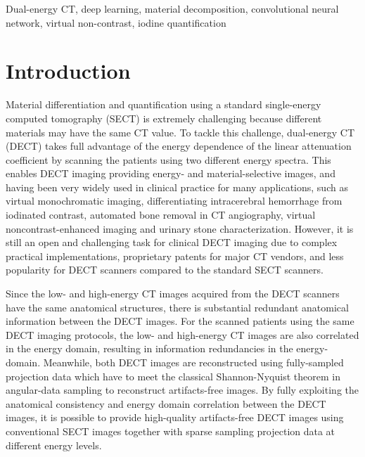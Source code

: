 \documentclass[journal,twoside,web]{ieeecolor}
\begin{document}
\begin{IEEEkeywords}
Dual-energy CT, deep learning, material decomposition, convolutional neural network, virtual non-contrast, iodine quantification
\end{IEEEkeywords}

\section{Introduction}
\label{sect:intro}  %
Material differentiation and quantification using a standard single-energy computed tomography (SECT) is extremely challenging because different materials may have the same CT value\cite{ref1}. To tackle this challenge, dual-energy CT (DECT) takes full advantage of the energy dependence of the linear attenuation coefficient by scanning the patients using two different energy spectra\cite{ref2, ref3, ref4, ref5, ref6,lee2017feasibility,petrongolo2018single,xue2019accurate}. This enables DECT imaging providing energy- and material-selective images, and having been very widely used in clinical practice for many applications, such as virtual monochromatic imaging\cite{ref7, ref8}, differentiating intracerebral hemorrhage from iodinated contrast\cite{ref9}, automated bone removal in CT angiography\cite{ref10, ref11, ref12, ref13}, virtual noncontrast-enhanced imaging\cite{ref14, ref15, ref16, ref17, ref18, ref19} and urinary stone characterization\cite{ref20, ref21, ref22, ref25}. However, it is still an open and challenging task for clinical DECT imaging due to complex practical implementations, proprietary patents for major CT vendors, and less popularity for DECT scanners compared to the standard SECT scanners.

Since the low- and high-energy CT images acquired from the DECT scanners have the same anatomical structures, there is substantial redundant anatomical information between the DECT images. For the scanned patients using the same DECT imaging protocols, the low- and high-energy CT images are also correlated in the energy domain, resulting in information redundancies in the energy-domain\cite{ref26, ref27}. Meanwhile, both DECT images are reconstructed using fully-sampled projection data which have to meet the classical Shannon-Nyquist theorem in angular-data sampling to reconstruct artifacts-free images. By fully exploiting the anatomical consistency and energy domain correlation between the DECT images, it is possible to provide high-quality artifacts-free DECT images using conventional SECT images together with sparse sampling projection data at different energy levels.
\end{document}
